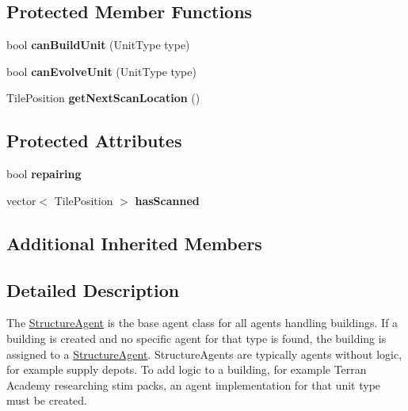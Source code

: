 \subsection*{Protected Member Functions}
\begin{DoxyCompactItemize}
\item 
\hypertarget{class_structure_agent_acd70cd5f5cfd30cb4ef6fef796b2d559}{bool {\bfseries can\-Build\-Unit} (Unit\-Type type)}\label{class_structure_agent_acd70cd5f5cfd30cb4ef6fef796b2d559}

\item 
\hypertarget{class_structure_agent_a1b922893f99a7580d02b262f2d558dea}{bool {\bfseries can\-Evolve\-Unit} (Unit\-Type type)}\label{class_structure_agent_a1b922893f99a7580d02b262f2d558dea}

\item 
\hypertarget{class_structure_agent_a0a7cf16b36da8528b59a5d2f1bc407f0}{Tile\-Position {\bfseries get\-Next\-Scan\-Location} ()}\label{class_structure_agent_a0a7cf16b36da8528b59a5d2f1bc407f0}

\end{DoxyCompactItemize}
\subsection*{Protected Attributes}
\begin{DoxyCompactItemize}
\item 
\hypertarget{class_structure_agent_abbe59b170a39875ee621987cc60c1fba}{bool {\bfseries repairing}}\label{class_structure_agent_abbe59b170a39875ee621987cc60c1fba}

\item 
\hypertarget{class_structure_agent_a17dc75ed638bfd9446d6b112ea64f63e}{vector$<$ Tile\-Position $>$ {\bfseries has\-Scanned}}\label{class_structure_agent_a17dc75ed638bfd9446d6b112ea64f63e}

\end{DoxyCompactItemize}
\subsection*{Additional Inherited Members}


\subsection{Detailed Description}
The \hyperlink{class_structure_agent}{Structure\-Agent} is the base agent class for all agents handling buildings. If a building is created and no specific agent for that type is found, the building is assigned to a \hyperlink{class_structure_agent}{Structure\-Agent}. Structure\-Agents are typically agents without logic, for example supply depots. To add logic to a building, for example Terran Academy researching stim packs, an agent implementation for that unit type must be created.

